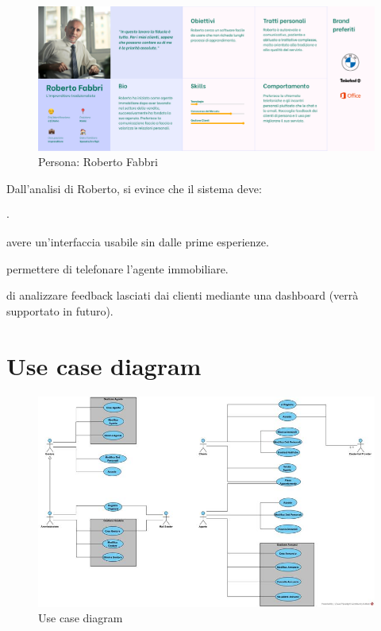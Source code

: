 \begin{figure}[h]
    \centering
    \includegraphics[width=\textwidth]{assets/personas/roberto-fabbri.png}
    \caption{Persona: Roberto Fabbri}
    \label{fig:roberto-fabbri}
\end{figure}

\noindent
Dall'analisi di Roberto, si evince che il sistema deve:
\begin{list}{$\cdot$}{}
    \item avere un'interfaccia usabile sin dalle prime esperienze.
    \item permettere di telefonare l'agente immobiliare.
    \item di analizzare feedback lasciati dai clienti mediante una dashboard (verrà supportato in futuro).
\end{list}


\section{Use case diagram}
\begin{figure}[h]
    \centering
    \includegraphics[width=\textwidth]{assets/diagrams/use-case-diagram.jpg}
    \caption{Use case diagram}
    \label{fig:use-case-diagram}
\end{figure}

